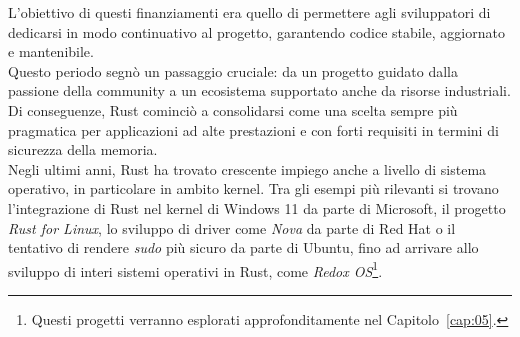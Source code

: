 L'obiettivo di questi finanziamenti era quello di permettere agli sviluppatori di dedicarsi in modo continuativo al progetto, garantendo
codice stabile, aggiornato e mantenibile. \hfill
\vspace{10pt}\\
\noindent Questo periodo segnò un passaggio cruciale: da un progetto guidato dalla passione della community a un ecosistema supportato anche
da risorse industriali. Di conseguenze, Rust cominciò a consolidarsi come una scelta sempre più pragmatica per applicazioni 
ad alte prestazioni e con forti requisiti in termini di sicurezza della memoria. \hfill
\vspace{15pt}\\
\noindent Negli ultimi anni, Rust ha trovato crescente impiego anche a livello di sistema operativo, in particolare in ambito kernel.
Tra gli esempi più rilevanti si trovano l'integrazione di Rust nel kernel di Windows 11 da parte di Microsoft,
il progetto \textit{Rust for Linux}, lo sviluppo di driver come \textit{Nova} da parte di Red Hat o il tentativo di rendere
\textit{sudo} più sicuro da parte di Ubuntu, fino ad arrivare allo sviluppo di interi sistemi operativi in Rust, come \textit{Redox OS}\footnote{Questi progetti verranno esplorati approfonditamente nel Capitolo~\ref{cap:05}.}.